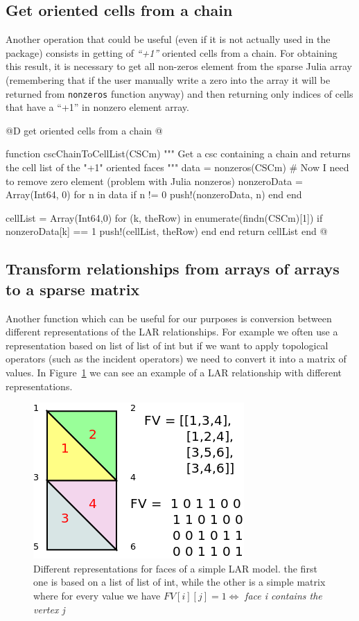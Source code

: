 \documentclass[11pt,oneside]{article}	%
\begin{document}
\subsection{Get oriented cells from a chain}\label{sec:getCellsFromChain}

Another operation that could be useful (even if it is not actually used in the package) consists in getting of \textit{``+1''} oriented cells from a chain. For obtaining this result, it is necessary to get all non-zeros element from the sparse Julia array (remembering that if the user manually write a zero into the array it will be returned from \texttt{nonzeros} function anyway) and then returning only indices of cells that have a ``+1'' in nonzero element array.

@D get oriented cells from a chain
@{function cscChainToCellList(CSCm)
  """
  Get a csc containing a chain and returns
  the cell list of the "+1" oriented faces
  """
  data = nonzeros(CSCm)
  # Now I need to remove zero element (problem with Julia nonzeros)
  nonzeroData = Array(Int64, 0)
  for n in data
    if n != 0
      push!(nonzeroData, n)
    end
  end

  cellList = Array(Int64,0)
  for (k, theRow) in enumerate(findn(CSCm)[1])
    if nonzeroData[k] == 1
      push!(cellList, theRow)
    end
  end
  return cellList
end @}

\subsection{Transform relationships from arrays of arrays to a sparse matrix}\label{sec:transformSparse}

Another function which can be useful for our purposes is conversion between different representations of the LAR relationships. For example we often use a representation based on list of list of int but if we want to apply topological operators (such as the incident operators) we need to convert it into a matrix of values. In Figure~\ref{fig:LARRepresentations} we can see an example of a LAR relationship with different representations.

\begin{figure}[htb] %
   \centering
   \includegraphics[width=0.45\linewidth]{images/LARRepresentations.png}
   \caption{Different representations for faces of a simple LAR model. the first one is based on a list of list of int, while the other is a simple matrix where for every value we have $FV[i][j] = 1 \iff $ \textit{face i contains the vertex j} }
   \label{fig:LARRepresentations}
\end{figure}
\end{document}
